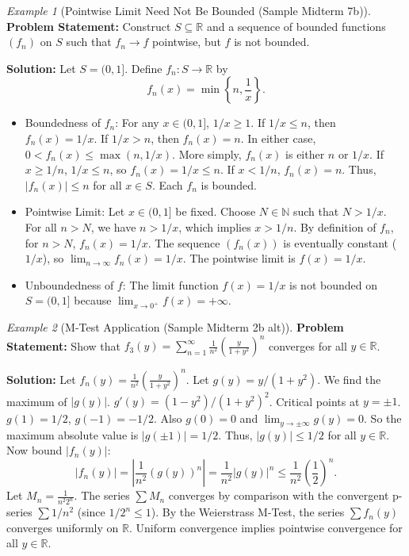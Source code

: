 \documentclass{article}
\theoremstyle{definition}
\theoremstyle{plain}
\theoremstyle{remark}
\newtheorem{example}{Example}[section]
\newcommand{\R}{\mathbb{R}}
\newcommand{\N}{\mathbb{N}}
\begin{document}
\begin{example}[Pointwise Limit Need Not Be Bounded (Sample Midterm 7b)]
\textbf{Problem Statement:} Construct \(S \subseteq \R\) and a sequence of bounded functions \((f_n)\) on \(S\) such that \(f_n \to f\) pointwise, but \(f\) is not bounded.

\textbf{Solution:} Let \(S = (0, 1]\). Define \(f_n: S \to \R\) by
\[ f_n(x) = \min\left\{n, \frac{1}{x}\right\}. \]
\begin{itemize}
    \item Boundedness of \(f_n\): For any \(x \in (0, 1]\), \(1/x \ge 1\). If \(1/x \le n\), then \(f_n(x)=1/x\). If \(1/x > n\), then \(f_n(x)=n\). In either case, \(0 < f_n(x) \le \max(n, 1/x)\). More simply, \(f_n(x)\) is either \(n\) or \(1/x\). If \(x \ge 1/n\), \(1/x \le n\), so \(f_n(x)=1/x \le n\). If \(x < 1/n\), \(f_n(x)=n\). Thus, \(|f_n(x)| \le n\) for all \(x \in S\). Each \(f_n\) is bounded.
    \item Pointwise Limit: Let \(x \in (0, 1]\) be fixed. Choose \(N \in \N\) such that \(N > 1/x\). For all \(n > N\), we have \(n > 1/x\), which implies \(x > 1/n\). By definition of \(f_n\), for \(n > N\), \(f_n(x) = 1/x\). The sequence \((f_n(x))\) is eventually constant (\(1/x\)), so \(\lim_{n\to\infty} f_n(x) = 1/x\). The pointwise limit is \(f(x) = 1/x\).
    \item Unboundedness of \(f\): The limit function \(f(x) = 1/x\) is not bounded on \(S = (0, 1]\) because \(\lim_{x\to 0^+} f(x) = +\infty\).
\end{itemize}
\end{example}

\begin{example}[M-Test Application (Sample Midterm 2b alt)]
\textbf{Problem Statement:} Show that \(f_3(y)=\sum_{n=1}^\infty \frac{1}{n^2} \left( \frac{y}{1+y^2}\right)^n\) converges for all \(y\in \R\).

\textbf{Solution:} Let \(f_n(y) = \frac{1}{n^2} \left( \frac{y}{1+y^2}\right)^n\). Let \(g(y) = y/(1+y^2)\). We find the maximum of \(|g(y)|\). \(g'(y) = (1-y^2)/(1+y^2)^2\). Critical points at \(y=\pm 1\). \(g(1)=1/2\), \(g(-1)=-1/2\). Also \(g(0)=0\) and \(\lim_{y\to\pm\infty} g(y) = 0\). So the maximum absolute value is \(|g(\pm 1)| = 1/2\). Thus, \(|g(y)| \le 1/2\) for all \(y \in \R\).
Now bound \(|f_n(y)|\):
\[ |f_n(y)| = \left| \frac{1}{n^2} (g(y))^n \right| = \frac{1}{n^2} |g(y)|^n \le \frac{1}{n^2} \left(\frac{1}{2}\right)^n. \]
Let \(M_n = \frac{1}{n^2 2^n}\). The series \(\sum M_n\) converges by comparison with the convergent p-series \(\sum 1/n^2\) (since \(1/2^n \le 1\)).
By the Weierstrass M-Test, the series \(\sum f_n(y)\) converges uniformly on \(\R\). Uniform convergence implies pointwise convergence for all \(y \in \R\).
\end{example}
\end{document}
